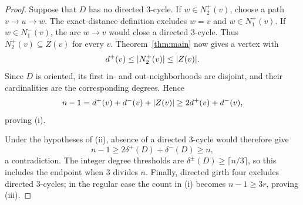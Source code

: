 \begin{proof}
Suppose that \(D\) has no directed \(3\)-cycle.  If \(w\in N_2^+(v)\),
choose a path \(v\to u\to w\).  The exact-distance definition excludes
\(w=v\) and \(w\in N_1^+(v)\).  If \(w\in N_1^-(v)\), the arc \(w\to v\)
would close a directed \(3\)-cycle.  Thus
\(N_2^+(v)\subseteq Z(v)\) for every \(v\).  Theorem~\ref{thm:main}
now gives a vertex with
\[
 d^+(v)\leq\lvert N_2^+(v)\rvert\leq\lvert Z(v)\rvert.
\]
Since \(D\) is oriented, its first in- and out-neighborhoods are disjoint,
and their cardinalities are the corresponding degrees.  Hence
\[
 n-1=d^+(v)+d^-(v)+\lvert Z(v)\rvert
 \geq 2d^+(v)+d^-(v),
\]
proving \textup{(i)}.

Under the hypotheses of \textup{(ii)}, absence of a directed \(3\)-cycle
would therefore give
\[
 n-1\geq2\delta^+(D)+\delta^-(D)\geq n,
\]
a contradiction.  The integer degree thresholds are
\(\delta^\pm(D)\geq\lceil n/3\rceil\), so this includes the endpoint
when \(3\) divides \(n\).  Finally, directed girth four excludes directed
\(3\)-cycles; in the regular case the count in \textup{(i)} becomes
\(n-1\geq3r\), proving \textup{(iii)}.
\end{proof}

